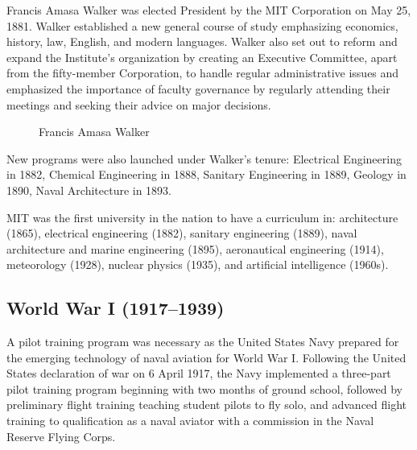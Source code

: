 Francis Amasa Walker was elected President by the MIT Corporation on May 25, 1881. Walker established a new general course of study emphasizing economics, history, law, English, and modern languages. Walker also set out to reform and expand the Institute's organization by creating an Executive Committee, apart from the fifty-member Corporation, to handle regular administrative issues and emphasized the importance of faculty governance by regularly attending their meetings and seeking their advice on major decisions.

\begin{figure}[h]
\caption{Francis Amasa Walker}
\end{figure}

New programs were also launched under Walker's tenure: Electrical Engineering in 1882, Chemical Engineering in 1888, Sanitary Engineering in 1889, Geology in 1890, Naval Architecture in 1893.

MIT was the first university in the nation to have a curriculum in: architecture (1865), electrical engineering (1882), sanitary engineering (1889), naval architecture and marine engineering (1895), aeronautical engineering (1914), meteorology (1928), nuclear physics (1935), and artificial intelligence (1960s).

\subsection{World War I (1917–1939)}

A pilot training program was necessary as the United States Navy prepared for the emerging technology of naval aviation for World War I. Following the United States declaration of war on 6 April 1917, the Navy implemented a three-part pilot training program beginning with two months of ground school, followed by preliminary flight training teaching student pilots to fly solo, and advanced flight training to qualification as a naval aviator with a commission in the Naval Reserve Flying Corps.

